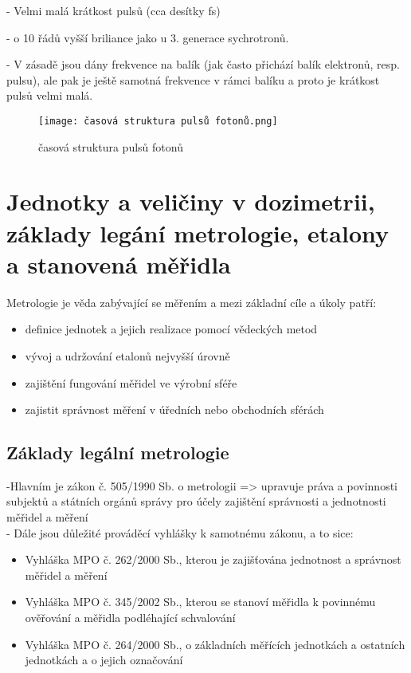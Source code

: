 - Velmi malá krátkost pulsů (cca desítky fs)

- o 10 řádů vyšší briliance jako u 3. generace sychrotronů. 

- V zásadě jsou dány frekvence na balík (jak často přichází balík elektronů, resp. pulsu), ale pak je ještě samotná frekvence v rámci balíku a proto je krátkost pulsů velmi malá.

\begin{figure}[ht!]
    \centering
    \texttt{[image: časová struktura pulsů fotonů.png]}
    \caption{časová struktura pulsů fotonů}
\end{figure}

\newpage
\section{Jednotky a veličiny v dozimetrii, základy legání metrologie, etalony a stanovená měřidla}

Metrologie je věda zabývající se měřením a mezi základní cíle a úkoly patří:
\begin{itemize}
    \item definice jednotek a jejich realizace pomocí vědeckých metod
    \item vývoj a udržování etalonů nejvyšší úrovně
    \item zajištění fungování měřidel ve výrobní sféře
    \item zajistit správnost měření v úředních nebo obchodních sférách
\end{itemize}

\subsection{Základy legální metrologie}

-Hlavním je zákon č. 505/1990 Sb. o metrologii => upravuje práva a povinnosti subjektů a státních orgánů správy pro účely zajištění správnosti a jednotnosti měřidel a měření
\\

- Dále jsou důležité prováděcí vyhlášky k samotnému zákonu, a to sice:
\begin{itemize}
    \item Vyhláška MPO č. 262/2000 Sb., kterou je zajišťována jednotnost a správnost měřidel a měření

    \item Vyhláška MPO č. 345/2002 Sb., kterou se stanoví měřidla k povinnému ověřování a měřidla podléhající schvalování

    \item Vyhláška MPO č. 264/2000 Sb., o základních měřících jednotkách a ostatních jednotkách a o jejich označování
\end{itemize}

